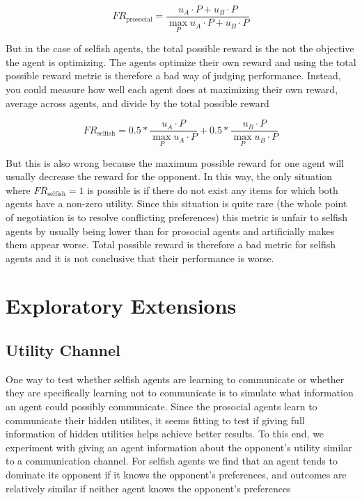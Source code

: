 \documentclass{article}
\begin{document}
\begin{equation}
    FR_{\text{prosocial}} = \frac{u_A \cdot P + u_B \cdot P}{\max_P u_A \cdot P + u_B \cdot P}
\end{equation}

But in the case of selfish agents, the total possible reward is the not the
objective the agent is optimizing. The agents optimize their own reward and
using the total possible reward metric is therefore a bad way of judging
performance. Instead, you could measure how well each agent does at maximizing
their own reward, average across agents, and divide by the total possible reward

\begin{equation}
    FR_{\text{selfish}} = 0.5 * \frac{u_A \cdot P}{\max_P u_A \cdot P} + 0.5 * \frac{u_B \cdot P}{\max_P u_B \cdot P}
\end{equation}

But this is also wrong because the maximum possible reward for one agent will
usually decrease the reward for the opponent. In this way, the only situation where
$FR_{\text{selfish}} = 1$ is possible is if there do not exist any items for
which both agents have a non-zero utility. Since this situation is quite rare
(the whole point of negotiation is to resolve conflicting preferences) this
metric is unfair to selfish agents by usually being lower than for prosocial
agents and artificially makes them appear worse. Total possible reward is
therefore a bad metric for selfish agents and it is not conclusive that their
performance is worse.


\section{Exploratory Extensions}%
\label{sec:exploratory_experiments}

\subsection{Utility Channel}%
\label{sub:preferences_channel}
One way to test whether selfish agents are learning to communicate or whether
they are specifically learning not to communicate is to simulate what
information an agent could possibly communicate. Since the prosocial agents
learn to communicate their hidden utilites, it seems fitting to test if giving
full information of hidden utilities helps achieve better
results. To this end, we experiment with giving an agent information about the
opponent's utility similar to a communication channel. For selfish agents we
find that an agent tends to dominate its opponent if it knows the opponent's
preferences, and outcomes are relatively similar if neither agent knows the
opponent's preferences
\end{document}
